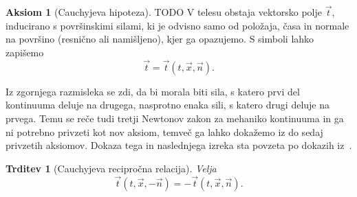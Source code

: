\documentclass[12pt,a4paper,twoside]{article}
\theoremstyle{definition} %
\newtheorem{aksiom}{Aksiom}
\theoremstyle{plain} %
\newtheorem{trditev}[definicija]{Trditev}
\numberwithin{equation}{section}
\newcommand{\vt}{\vec{t}}
\newcommand{\vn}{\vec{n}}
\newcommand{\vx}{\vec{x}}
\begin{document}
\begin{aksiom}[Cauchyjeva hipoteza] TODO
  V telesu obstaja vektorsko polje $\vt$, inducirano s površinskimi silami, ki
  je odvisno samo od položaja, časa in normale na površino (resnično ali
  namišljeno), kjer ga opazujemo. S simboli lahko zapišemo
  \begin{equation}
    \vt = \vt(t, \vx, \vn).
  \end{equation}
\end{aksiom}

Iz zgornjega razmisleka se zdi, da bi morala biti sila, s katero prvi del
kontinuuma deluje na drugega, nasprotno enaka sili, s katero drugi deluje na
prvega. Temu se reče tudi tretji Newtonov zakon za mehaniko kontinuuma in
ga ni potrebno privzeti kot nov aksiom, temveč ga lahko dokažemo iz do sedaj
privzetih aksiomov. Dokaza tega in naslednjega izreka sta povzeta po dokazih
iz~\cite[str.\ 104--107]{hjelmstad2007fundamentals}.
\begin{trditev}[Cauchyjeva recipročna relacija]
  \label{trd:cauchy-reciprocal}
  Velja
  \begin{equation}
    \vt(t, \vx, -\vn) = -\vt(t, \vx, \vn).
    \label{eq:cauchy-reciprocal}
  \end{equation}
\end{trditev}
\end{document}
